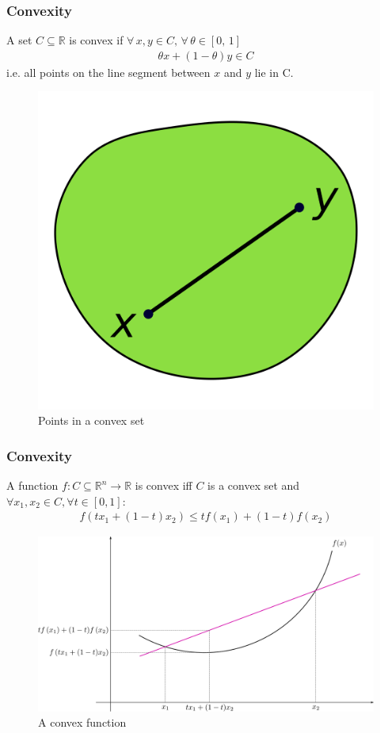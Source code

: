 \documentclass{beamer}
\def\rnum{\mathbb{R}}
\begin{document}
\begin{frame}
    \frametitle{Convexity}
    A set $C \subseteq \mathbb{R}$ is convex if $\forall \,  x,  y \in C, \,
    \forall \, \theta \in [0, \, 1]$
    \begin{align*}
        \theta x + (1-\theta)y \in C
    \end{align*}
    i.e. all points on the line segment between $x$ and $y$ lie in C.
    \begin{figure}[t]
        \centering
        \includegraphics[scale=0.05]{polygon}
        \caption{Points in a convex set}
        \label{fig:h}
    \end{figure}
\end{frame}

\begin{frame}
    \frametitle{Convexity}
    A function $f : C \subseteq \rnum^{n} \rightarrow \rnum$ is convex iff $C$
    is a convex set and $\forall x_{1}, x_{2} \in C, \forall t \in [0,1]$:
    \begin{align*}
        f(t x_{1} + (1-t)x_{2}) \leq t f(x_{1}) + (1-t)f(x_{2})
    \end{align*}
    \begin{figure}[t]
        \centering
        \includegraphics[scale=0.225]{function}
        \caption{A convex function}
        \label{fig:function}
    \end{figure}
\end{frame}
\end{document}
